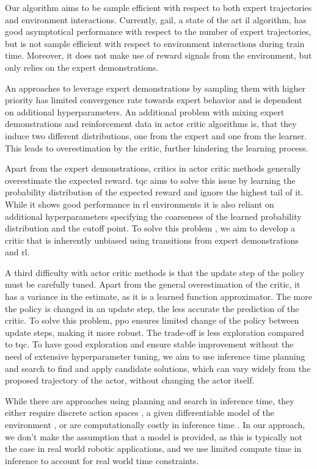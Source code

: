 Our algorithm aims to be sample efficient with respect to both expert trajectories and environment interactions. 
Currently, \ac{gail}, a state of the art \ac{il} algorithm, has good asymptotical performance with respect to the number of expert trajectories, but is not sample efficient 
with respect to environment interactions during train time. Moreover, it does not make use of reward signals from the environment, but only relies on the expert demonstrations.

An approaches to leverage expert demonstrations by sampling them with higher priority \cite{vecerik2018leveraging} has limited convergence rate towards expert behavior and is dependent on additional hyperparameters. 
An additional problem with mixing expert demonstrations and reinforcement data in actor critic algorithms is, that they induce two different distributions, one from the expert and one from 
the learner. This leads to overestimation by the critic, further hindering the learning process.

Apart from the expert demonstrations, critics in actor critic methods generally overestimate the expected reward. \ac{tqc} \cite{TQC_Paper} aims to solve this issue by learning the 
probability distribution of the expected reward and ignore the highest tail of it. While it shows good performance in \ac{rl} environments 
it is also reliant on additional hyperparameters 
specifying the coarseness of the learned probability distribution and the cutoff point. To solve this problem , we aim to develop a critic that is inherently unbiased using transitions from expert demonstrations 
and \ac{rl}.

A third difficulty with actor critic methods is that the update step of the policy must be carefully tuned. Apart from the general overestimation of the critic, it has a variance in the estimate, 
as it is a learned function approximator. The more the policy is changed in an update step, the less accurate the prediction of the critic. To solve this problem, \ac{ppo} ensures limited change of the policy 
between update steps, making it more robust. The trade-off is less exploration compared to \ac{tqc}. To have good exploration 
and ensure stable improvement without the need of extensive hyperparameter tuning, we aim to use inference time planning and search to find and apply candidate solutions, which can vary widely from the 
proposed trajectory of the actor, without changing the actor itself.

While there are approaches using planning and search in inference time, they either require discrete action spaces \cite{MUZero}, a given differentiable model of the environment \cite{Lee_Jeon_Kim_Kim_2020} \cite{Manna2022}, 
or are computationally costly in inference time \cite{hafner2018planet}. 
In our approach, we 
don't make the assumption that a model is provided, as this is typically not the case in real world robotic applications, and we use limited compute time in inference to account for real world time 
constraints.